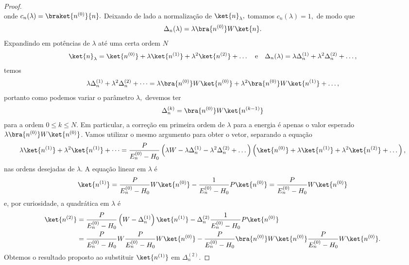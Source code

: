 \begin{proof}
\begin{equation*}
    \end{equation*}
    onde \(c_n(\lambda) = \braket{n^{(0)}}{n}.\) Deixando de lado a normalização de \(\ket{n}_\lambda,\) tomamos \(c_n(\lambda) = 1,\) de modo que
    \begin{equation*}
        \Delta_n(\lambda) = \lambda \bra{n^{(0)}} W\ket{n}.
    \end{equation*}
    Expandindo em potências de \(\lambda\) até uma certa ordem \(N\)
    \begin{equation*}
        \ket{n}_\lambda = \ket{n^{(0)}} + \lambda \ket{n^{(1)}} + \lambda^2 \ket{n^{(2)}} + \dots
        \quad\text{e}\quad
        \Delta_{n}(\lambda) = \lambda \Delta_{n}^{(1)} + \lambda^2 \Delta_{n}^{(2)} + \dots,
    \end{equation*}
    temos
    \begin{equation*}
        \lambda \Delta_{n}^{(1)} + \lambda^2 \Delta_{n}^{(2)} + \dots = \lambda \bra{n^{(0)}}W\ket{n^{(0)}} + \lambda^2 \bra{n^{(0)}}W\ket{n^{(1)}} + \dots,
    \end{equation*}
    portanto como podemos variar o parâmetro \(\lambda,\) devemos ter
    \begin{equation*}
        \Delta_n^{(k)} = \bra{n^{(0)}}W\ket{n^{(k-1)}}
    \end{equation*}
    para a ordem \(0\leq k\leq N\). Em particular, a correção em primeira ordem de \(\lambda\) para a energia é apenas o valor esperado \(\lambda\bra{n^{(0)}}W\ket{n^{(0)}}\). Vamos utilizar o mesmo argumento para obter o vetor, separando a equação
    \begin{equation*}
        \lambda\ket{n^{(1)}} + \lambda^2 \ket{n^{(1)}} + \dots = \frac{P}{E_n^{(0)} - H_0} \left(\lambda W - \lambda \Delta_n^{(1)} - \lambda^2 \Delta_n^{(2)} + \dots \right)\left(\ket{n^{(0)}} + \lambda \ket{n^{(1)}} + \lambda^2 \ket{n^{(2)}} + \dots\right),
    \end{equation*}
    nas ordens desejadas de \(\lambda.\) A equação linear em \(\lambda\) é
    \begin{equation*}
        \ket{n^{(1)}} = \frac{P}{E_n^{(0)}- H_0} W \ket{n^{(0)}} - \frac{1}{E_n^{(0)} - H_0}P\ket{n^{(0)}} = \frac{P}{E_n^{(0)}- H_0} W \ket{n^{(0)}}
    \end{equation*}
    e, por curiosidade, a quadrática em \(\lambda\) é
    \begin{align*}
        \ket{n^{(2)}} &= \frac{P}{E_n^{(0)} - H_0} \left(W - \Delta_n^{(1)}\right)\ket{n^{(1)}} - \Delta_n^{(2)}\frac{1}{E_n^{(0)} - H_0}P\ket{n^{(0)}}\\
                      &= \frac{P}{E_n^{(0)}- H_0} W \frac{P}{E_n^{(0)} - H_0} W \ket{n^{(0)}} - \frac{P}{E_n^{(0)} - H_0}\bra{n^{(0)}}W\ket{n^{(0)}} \frac{P}{E_n^{(0)} - H_0} W \ket{n^{(0)}}.
    \end{align*}
    Obtemos o resultado proposto ao substituir \(\ket{n^{(1)}}\) em \(\Delta_n^{(2)}.\)
\end{proof}

